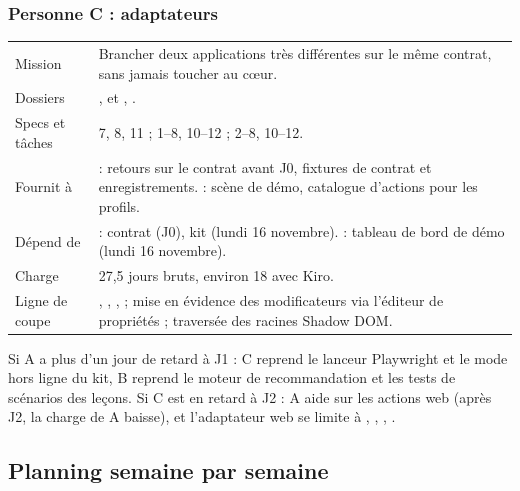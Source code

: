 \subsubsection*{\textcolor{pc}{Personne C : adaptateurs}}

\begin{xltabular}{\textwidth}{@{}L{3.2cm}Y@{}}
\toprule
Mission & Brancher deux applications très différentes sur le même contrat, sans jamais toucher au cœur. \\
Dossiers & ,  et , . \\
Specs et tâches &  7, 8, 11 ;  1--8, 10--12 ;  2--8, 10--12. \\
Fournit à & \PA{} : retours sur le contrat avant J0, fixtures de contrat et enregistrements. \PB{} : scène de démo, catalogue d'actions pour les profils. \\
Dépend de & \PA{} : contrat (J0), kit (lundi 16 novembre). \PB{} : tableau de bord de démo (lundi 16 novembre). \\
Charge & 27,5 jours bruts, environ 18 avec Kiro. \\
Ligne de coupe & , , ,  ; mise en évidence des modificateurs via l'éditeur de propriétés ; traversée des racines Shadow DOM. \\
\bottomrule
\end{xltabular}

\begin{keybox}
Si A a plus d'un jour de retard à J1 : C reprend le lanceur Playwright et le mode hors ligne du kit, B reprend le moteur de recommandation et les tests de scénarios des leçons. Si C est en retard à J2 : A aide sur les actions web (après J2, la charge de A baisse), et l'adaptateur web se limite à , , , .
\end{keybox}

\subsection{Planning semaine par semaine}

